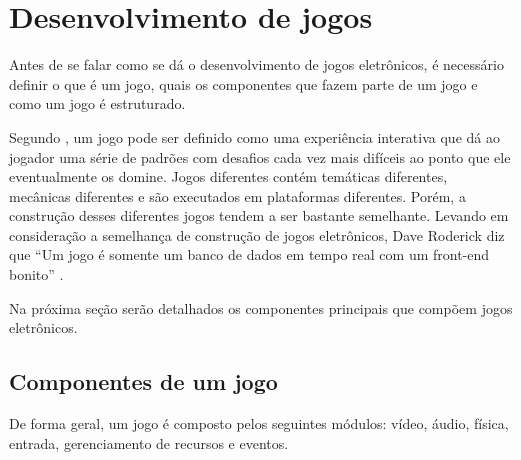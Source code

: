 \section{Desenvolvimento de jogos}

Antes de se falar como se dá o desenvolvimento de jogos eletrônicos, é necessário definir o que é um jogo, quais os componentes que fazem parte de um jogo e como um jogo é estruturado.

Segundo , um jogo pode ser definido como uma experiência interativa que dá ao jogador uma série de padrões com desafios cada vez mais difíceis ao ponto que ele eventualmente os domine. Jogos diferentes contém temáticas diferentes, mecânicas diferentes e são executados em plataformas diferentes. Porém, a construção desses diferentes jogos tendem a ser bastante semelhante. Levando em consideração a semelhança de construção de jogos eletrônicos, Dave Roderick diz que “Um jogo é somente um banco de dados em tempo real com um front-end bonito” \cite[p.~625]{rollings2004game}.

Na próxima seção serão detalhados os componentes principais que compõem jogos eletrônicos.

\subsection{Componentes de um jogo}

De forma geral, um jogo é composto pelos seguintes módulos: vídeo, áudio, física, entrada, gerenciamento de recursos e eventos.

